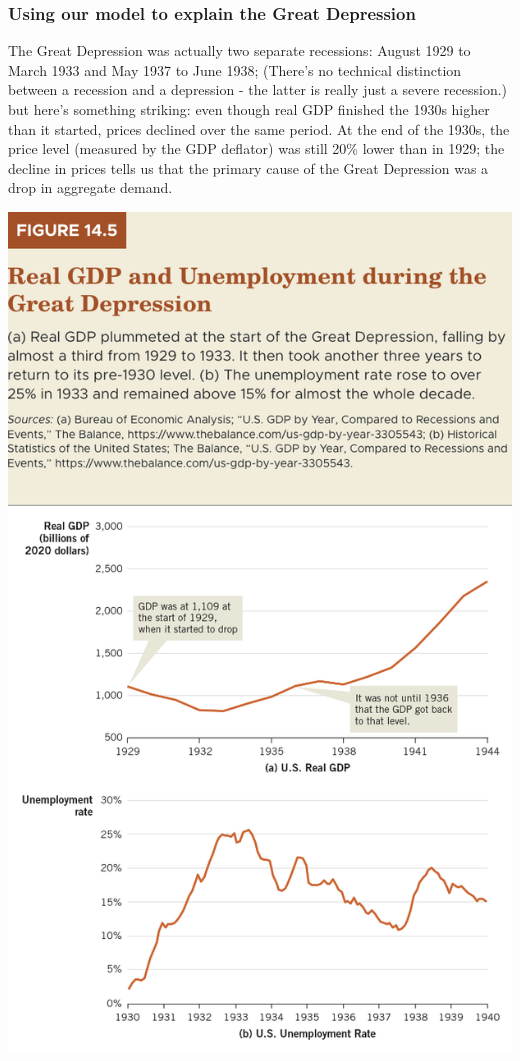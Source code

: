 \documentclass[11pt]{article} %
\begin{document}
\subsubsection*{Using our model to explain the Great Depression}
The Great Depression was actually two separate recessions: August 1929 to March 1933 and May 1937 to June 1938; (There's no technical distinction between a recession and a depression - the latter is really just a severe recession.) but here's something striking: even though real GDP finished the 1930s higher than it started, prices declined over the same period. At the end of the 1930s, the price level (measured by the GDP deflator) was still 20\% lower than in 1929; the decline in prices tells us that the primary cause of the Great Depression was a drop in aggregate demand.

\begin{center}
\includegraphics[scale=0.5]{images/Figure 14.5.png} 
\end{center}
\end{document}
